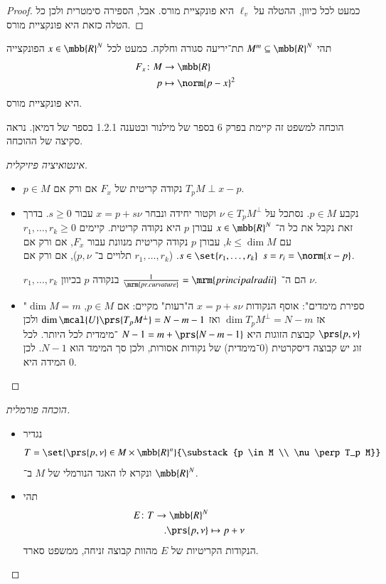 \documentclass[a4paper,10pt,twoside,openany]{book}
\begin{document}
\begin{proof}
כמעט לכל כיוון, ההטלה על
$\ell_v$
היא פונקציית מורס. אבל, הספירה סימטרית ולכן כל הטלה כזאת היא פונקציית מורס.
\end{proof}

\begin{theorem}
תהי
$M^m \subseteq \mbb{R}^N$
תת־יריעה סגורה וחלקה. כמעט לכל
$x \in \mbb{R}^N$
הפונקצייה
\begin{align*}
F_x \colon M &\to \mbb{R} \\
p &\mapsto \norm{p-x}^2
\end{align*}
היא פונקציית מורס.
\end{theorem}

הוכחה למשפט זה קיימת בפרק 6 בספר של מילנור ובטענה 1.2.1 בספר של דמיאן.
נראה סקיצה של ההוכחה.



\begin{proof}[אינטואיציה פיזיקלית]
\begin{itemize}
\item $p \in M$
נקודה קריטית של
$F_x$
אם ורק אם
$T_p M \perp x - p$.
\item נקבע
$p \in M$.
נסתכל על
$\nu \in T_p M^\perp$
וקטור יחידה ונבחר
$x = p + s \nu$
עבור
$s \geq 0$.
בדרך זאת נקבל את כל ה־%
$x \in \mbb{R}^N$
עבורן
$p$
היא נקודה קריטית.
קיימים
$r_1, \ldots, r_k \geq 0$
עם
$k \leq \dim M$,
עבורן
$p$
נקודה קריטית מנוונת עבור
$F_x$,
אם ורק אם
$s \in \set{r_1, \ldots, r_k}$.
($r_1, \ldots, r_k$
תלויים ב־%
$p,\nu$),
אם ורק אם
$s = r_i = \norm{x - p}$.

$r_1, \ldots, r_k$
הם ה־%
$\frac{1}{\mrm{pr. curvature}} = \mrm{principal radii}$
בנקודה
$p$
בכיוון
$\nu$.

\item "ספירת מימדים":
אוסף הנקודות
$x = p + s\nu$
ה"רעות" מקיים:
אם
$p \in M$, $\dim M = m$
אז
$\dim T_p M^\perp = N - m$
ואז
$\dim \mcal{U}\prs{T_p M^\perp} = N-m-1$
ולכן
$\prs{p,\nu}$
קבוצת הזוגות היא
$N-1 = m + \prs{N-m-1}$%
־מימדית לכל היותר.
לכל זוג יש קבוצה דיסקרטית (0־מימדית) של נקודות אסורות, ולכן סך המימד הוא
$N-1$.
לכן המידה היא
$0$.
\end{itemize}
\end{proof}

\begin{proof}[הוכחה פורמלית]
\begin{itemize}
\item נגדיר
\[T = \set{\prs{p,\nu} \in M \times \mbb{R}^n}{\substack{p \in M \\ \nu \perp T_p M}}\]
ונקרא לו האגד הנורמלי של
$M$
ב־%
$\mbb{R}^N$.
\item
תהי
\begin{align*}
E \colon T \to \mbb{R}^N \\
\text{.} \prs{p,\nu} &\mapsto p + \nu
\end{align*}
הנקודות הקריטיות של
$E$
מהוות קבוצה זניחה, ממשפט סארד.
\end{itemize}
\end{proof}
\end{document}
